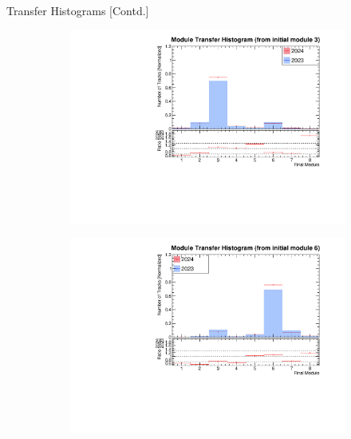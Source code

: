 \begin{frame}{Transfer Histograms [Contd.]}
    \begin{figure}
        \centering
        \begin{subfigure}[t]{0.49\linewidth}
            \includegraphics[width=\linewidth]{./ModuleLevelPlots/final_module_from_st0_module3.pdf}
        \end{subfigure}
        \begin{subfigure}[t]{0.49\linewidth}
            \includegraphics[width=\linewidth]{./ModuleLevelPlots/final_module_from_st0_module6.pdf}
        \end{subfigure}


\end{figure}
\end{frame}
